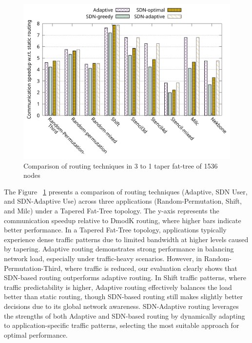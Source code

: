 \begin{figure}[h]
  \centering
  \includegraphics[width=\columnwidth]{./figs_4/routing_taper.pdf}
  \caption{Comparison of routing techniques in 3 to 1 taper fat-tree of 1536 nodes}
  \label{fig:routing_taper}
\end{figure}


The Figure ~\ref{fig:routing_taper} presents a comparison of routing techniques (Adaptive, SDN User, and SDN-Adaptive Use) across three applications (Random-Permutation, Shift, and Milc) under a Tapered Fat-Tree topology. The y-axis represents the communication speedup relative to DmodK routing, where higher bars indicate better performance. In a Tapered Fat-Tree topology, applications typically experience dense traffic patterns due to limited bandwidth at higher levels caused by tapering. Adaptive routing demonstrates strong performance in balancing network load, especially under traffic-heavy scenarios. However, in Random-Permutation-Third, where traffic is reduced, our evaluation clearly shows that SDN-based routing outperforms adaptive routing. In Shift traffic patterns, where traffic predictability is higher, Adaptive routing effectively balances the load better than static routing, though SDN-based routing still makes slightly better decisions due to its global network awareness. SDN-Adaptive routing leverages the strengths of both Adaptive and SDN-based routing by dynamically adapting to application-specific traffic patterns, selecting the most suitable approach for optimal performance. 

